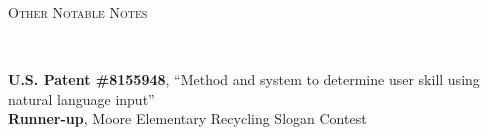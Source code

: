 \documentclass[9pt]{article}
\newenvironment{changemargin}[2]{%
  \begin{list}{}{%
    \setlength{\topsep}{0pt}%
    \setlength{\leftmargin}{#1}%
    \setlength{\rightmargin}{#2}%
    \setlength{\listparindent}{\parindent}%
    \setlength{\itemindent}{\parindent}%
    \setlength{\parsep}{\parskip}%
  }%
  \item[]}{\end{list}
}
\newcommand{\lineover}{
	\begin{changemargin}{-0.05in}{-0.05in}
		\vspace*{-8pt}
		\hrulefill \\
		\vspace*{-2pt}
	\end{changemargin}
}
\newcommand{\header}[1]{
	\begin{changemargin}{-0.5in}{-0.5in}
		\scshape{#1}\\
  	\lineover
	\end{changemargin}
}
\newenvironment{body} {
	\vspace*{-16pt}
	\begin{changemargin}{-0.25in}{-0.5in}
  }	
	{\end{changemargin}
}
\begin{document}
\medskip


\header{Other Notable Notes}

\begin{body}
	\vspace{14pt}
	\textbf{U.S. Patent \#8155948}, ``Method and system to determine user skill using natural language input''\\
	\medskip
	\textbf{Runner-up}, Moore Elementary Recycling Slogan Contest\\
\end{body}
\end{document}
